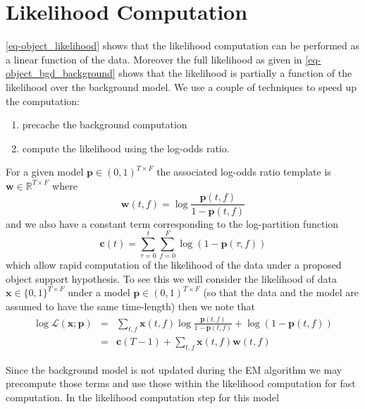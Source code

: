 \documentclass{article}
\begin{document}
\section{Likelihood Computation}

\autoref{eq-object_likelihood} shows that the likelihood computation
can be performed as a linear function of the data.  Moreover the full
likelihood as given in \autoref{eq-object_bgd_background} shows that the 
likelihood is partially a function of the likelihood over the background
model.  We use a couple of techniques to speed up the computation:
\begin{enumerate}
  \item precache the background computation
  \item compute the likelihood using the log-odds ratio.
\end{enumerate}

For a given model $\mathbf{p}\in (0,1)^{T\times F}$ the associated log-odds
ratio template is $\mathbf{w}\in \mathbb{R}^{T\times F}$ where 
$$
\mathbf{w}(t,f) = \log\frac{\mathbf{p}(t,f)}{1-\mathbf{p}(t,f)}
$$
and we also have a constant term corresponding to the log-partition function
$$
\mathbf{c}(t) = \sum_{\tau=0}^{t} \sum_{f=0}^F \log( 1-\mathbf{p}(\tau,f))
$$
which allow rapid computation of the likelihood of the data under a proposed
object support hypothesis. To see this we will consider the likelihood of
data $\mathbf{x}\in \{0,1\}^{T\times F}$ under a model $\mathbf{p}\in (0,1)^{T\times F}$ (so that the data and the model are assumed to have the same time-length) then we note that
\begin{equation}\label{eq-likelihood_comp_factored}
\begin{array}{rcl}
  \log\mathcal{L}(\mathbf{x}; \mathbf{p}) &=& \sum_{t,f} \mathbf{x}(t,f)\log\frac{\mathbf{p}(t,f) }{1-\mathbf{p}(t,f)} +\log(1-\mathbf{p}(t,f))\\
  &=& \mathbf{c}(T-1)+\sum_{t,f} \mathbf{x}(t,f)\mathbf{w}(t,f)
\end{array}\end{equation}

Since the background model is not updated during the EM algorithm
we may precompute those terms and use those within the likelihood computation
for fast computation.  In the likelihood computation step for this model
\end{document}
